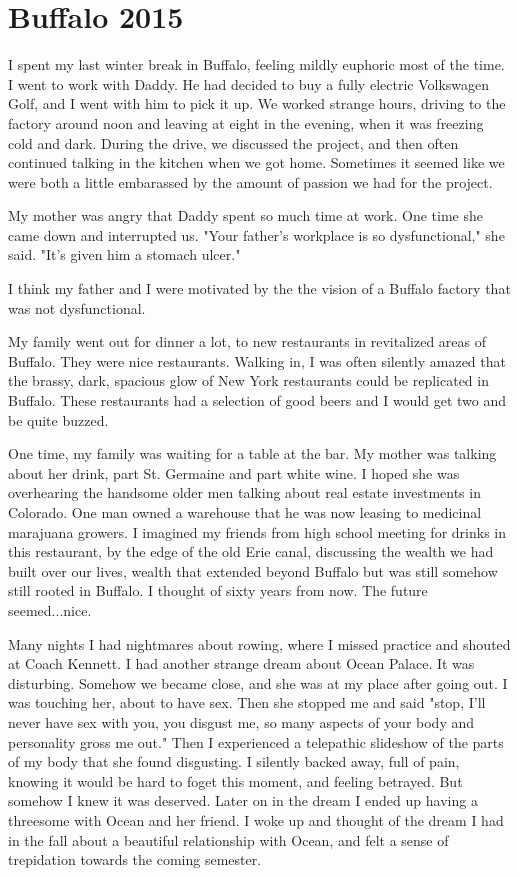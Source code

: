 \documentclass[12pt]{article}
\begin{document}
\section{Buffalo 2015}

I spent my last winter break in Buffalo, feeling mildly euphoric most of the
time.  I went to work with Daddy.  He had decided to buy a fully electric
Volkswagen Golf, and I went with him to pick it up.  We worked strange hours,
driving to the factory around noon and leaving at eight in the evening, when it
was freezing cold and dark.  During the drive, we discussed the project, and
then often continued talking in the kitchen when we got home.  Sometimes it
seemed like we were both a little embarassed by the amount of passion we
had for the project. 

My mother was angry that Daddy spent so much time at work.  One time she
came down and interrupted us.  "Your father's workplace is so dysfunctional,"
she said.  "It's given him a stomach ulcer."  

I think my father and I were motivated by the the vision of a Buffalo factory
that was not dysfunctional. 

My family went out for dinner a lot, to new restaurants in revitalized areas of
Buffalo.  They were nice restaurants.  Walking in, I was often silently amazed
that the brassy, dark, spacious glow of New York restaurants could be replicated
in Buffalo.  These restaurants had a selection of good beers and I would get two
and be quite buzzed.

One time, my family was waiting for a table at the bar.  My mother was talking
about her drink, part St. Germaine and part white wine.  I hoped she was
overhearing the handsome older men talking about real estate investments in
Colorado.  One man owned a warehouse that he was now leasing to medicinal
marajuana growers.  I imagined my friends from high school meeting for drinks in
this restaurant, by the edge of the old Erie canal, discussing the wealth we had
built over our lives, wealth that extended beyond Buffalo but was still somehow
still rooted in Buffalo.  I thought of sixty years from now.  The future
seemed...nice.

Many nights I had nightmares about rowing, where I missed practice and shouted
at Coach Kennett.  I had another strange dream about Ocean Palace.  It was
disturbing.  Somehow we became close, and she was at my place after going out.
I was touching her, about to have sex.  Then she stopped me and said "stop, I'll
never have sex with you, you disgust me, so many aspects of your body and
personality gross me out."  Then I experienced a telepathic slideshow of the
parts of my body that she found disgusting.  I silently backed away, full of
pain, knowing it would be hard to foget this moment, and feeling betrayed. But
somehow I knew it was deserved.  Later on in the dream I ended up having a
threesome with Ocean and her friend.  I woke up and thought of the dream I had
in the fall about a beautiful relationship with Ocean, and felt a sense of
trepidation towards the coming semester.
\end{document}
